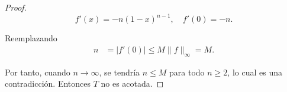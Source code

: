\begin{enumerate}
\begin{sol}
\begin{proof}
$$
f'(x) = -n(1 - x)^{n - 1}, \quad f'(0) = -n.
$$

Reemplazando
\begin{align*}
n &= |f'(0)| \leq M \|f\|_\infty = M.
\end{align*}

Por tanto, cuando $n \to \infty$, se tendría $n \leq M$ para todo $n \geq 2$, lo cual es una contradicción. Entonces $T$ no es acotada.

\end{proof}
        
\end{sol}
\end{enumerate}
\newpage

